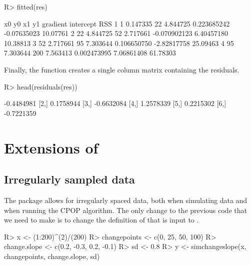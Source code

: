 \documentclass[article]{jss}
\begin{document}
\begin{CodeChunk}
\begin{CodeInput}
R> fitted(res)
\end{CodeInput}
\begin{CodeOutput}
  x0       y0  x1       y1     gradient   intercept      RSS
1  1 0.147335  22 4.844725  0.223685242 -0.07635023 10.07761
2 22 4.844725  52 2.717661 -0.070902123  6.40457180 10.38813
3 52 2.717661  95 7.303644  0.106650750 -2.82817758 25.09463
4 95 7.303644 200 7.563413  0.002473995  7.06861408 61.78303
\end{CodeOutput}
\end{CodeChunk}
%
%
Finally, the function   creates a single column matrix containing the residuals.
\newpage
\begin{CodeChunk}
\begin{CodeInput}
R> head(residuals(res))
\end{CodeInput}
\begin{CodeOutput}
           [,1]
[1,] -0.4484981
[2,]  0.1758944
[3,] -0.6632084
[4,]  1.2578339
[5,]  0.2215302
[6,] -0.7221359
\end{CodeOutput}
\end{CodeChunk}

\section[Extensions of {cpop}]{Extensions of } \label{sec:extensions}

\subsection{Irregularly sampled data}

The  package allows for irregularly spaced data, both when simulating data and when running the CPOP algorithm. The only change to the previous code that we need to make is to change the definition of  that is input to .

\begin{CodeChunk}
\begin{CodeInput}
R> x <- (1:200)^(2)/(200)
R> changepoints <- c(0, 25, 50, 100)
R> change.slope <- c(0.2, -0.3, 0.2, -0.1)
R> sd <- 0.8
R> y <- simchangeslope(x, changepoints, change.slope, sd)
\end{CodeInput}
\end{CodeChunk}
\end{document}
